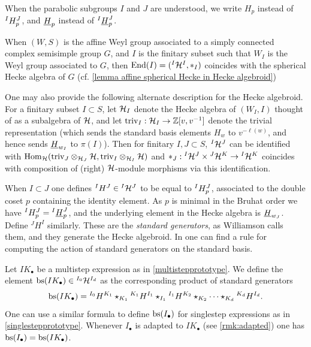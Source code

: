 When the parabolic subgroups $I$ and $J$ are understood, we write $H_p$ instead of ${}^{I}H^{J}_{p}$, and $\underline{H}_{p}$ instead of ${}^{I}\underline{H}^{J}_{p}$.

\begin{remark}
    When $(W,S)$ is the affine Weyl group associated to a simply connected complex semisimple group $G$, and $I$ is the finitary subset such that $W_I$ is the Weyl group associated to $G$, then $\operatorname{End}(I)=({}^I\mathcal{H}^{I},\ast_I)$ coincides with the spherical Hecke algebra of $G$ (cf. \cref{lemma affine spherical Hecke in Hecke algebroid})
\end{remark}

\begin{remark}
One may also provide the following alternate description for the Hecke algebroid.
For a finitary subset $I\subset S$, let $\mathcal{H}_I$ denote the Hecke algebra of $(W_I,I)$ thought of as a subalgebra of $\mathcal{H}$, and let $\text{triv}_I: \mathcal{H}_I \rightarrow \mathbb{Z}[v,v^{-1}]$ denote the trivial representation (which sends the standard basis elements $H_{w}$ to $v^{-\ell(w)}$, and hence sends $\underline{H}_{w_I}$ to $\pi(I)$). 
Then for finitary $I,J \subset S$, ${}^I\mathcal{H}^J$ can be identified with $\operatorname{Hom}_{\mathcal{H}}(\text{triv}_J\otimes_{\mathcal{H}_J}\mathcal{H}, \text{triv}_I\otimes_{\mathcal{H}_I}\mathcal{H})$ and $\ast_J:{}^I\mathcal{H}^J\times {}^J\mathcal{H}^K \rightarrow {}^I\mathcal{H}^K$ coincides with composition of (right) $\mathcal{H}$-module morphisms via this identification.
\end{remark}

When $I \subset J$ one defines ${}^I H^J \in {}^I \mathcal{H}^J$ to be equal to ${}^{I}H^{J}_{p}$, associated to the double coset $p$ containing the identity element. As $p$ is minimal in the Bruhat order we have ${}^{I}H^{J}_{p} = {}^{I}\underline{H}^{J}_{p}$, and the underlying element in the Hecke algebra is $\underline{H}_{w_J}$.  Define ${}^J H^I$ similarly. These are the \emph{standard generators}, as Williamson calls them, and they generate the Hecke algebroid. In \cite[Proposition 2.3.3]{WillSingular} one can find a rule for computing the action of standard generators on the standard basis.

Let $IK_{\bullet}$ be a multistep expression as in \eqref{multistepprototype}. We define the element $\operatorname{bs}(IK_{\bullet}) \in {}^{I_0} \mathcal{H}^{I_d}$ as the corresponding product of standard generators
\begin{equation} \operatorname{bs}(IK_{\bullet}) = {}^{I_0} H^{K_1} \star_{K_1} {}^{K_1} H^{I_1} \star_{I_1} {}^{I_1} H^{K_2} \star_{K_2} \cdots \star_{K_d} {}^{K_d} H^{I_d}. \end{equation}
One can use a similar formula to define $\operatorname{bs}(I_{\bullet})$ for singlestep expressions as in \eqref{singlestepprototype}. Whenever $I_{\bullet}$ is adapted to $IK_{\bullet}$ (see \cref{rmk:adapted}) one has $\operatorname{bs}(I_{\bullet}) = \operatorname{bs}(IK_{\bullet})$.


